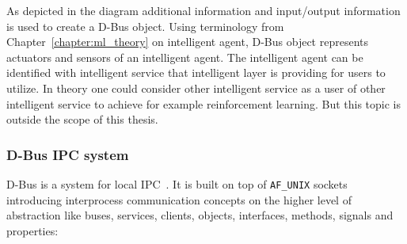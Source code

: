\documentclass[english, 12pt, a4paper, elec, utf8, online]{aaltothesis}
\begin{document}
As depicted in the diagram additional information and input/output information is used to create a D-Bus object. Using terminology from Chapter~\ref{chapter:ml_theory} on intelligent agent, D-Bus object represents actuators and sensors of an intelligent agent. The intelligent agent can be identified with intelligent service that intelligent layer is providing for users to utilize. In theory one could consider other intelligent service as a user of other intelligent service to achieve for example reinforcement learning. But this topic is outside the scope of this thesis.           

\subsubsection{D-Bus IPC system}
D-Bus is a system for local IPC~\cite{dbus_spec}. It is built on top of \texttt{AF\_UNIX} sockets introducing interprocess communication concepts on the higher level of abstraction  like buses, services, clients, objects, interfaces, methods, signals and properties:  
    
\end{document}

